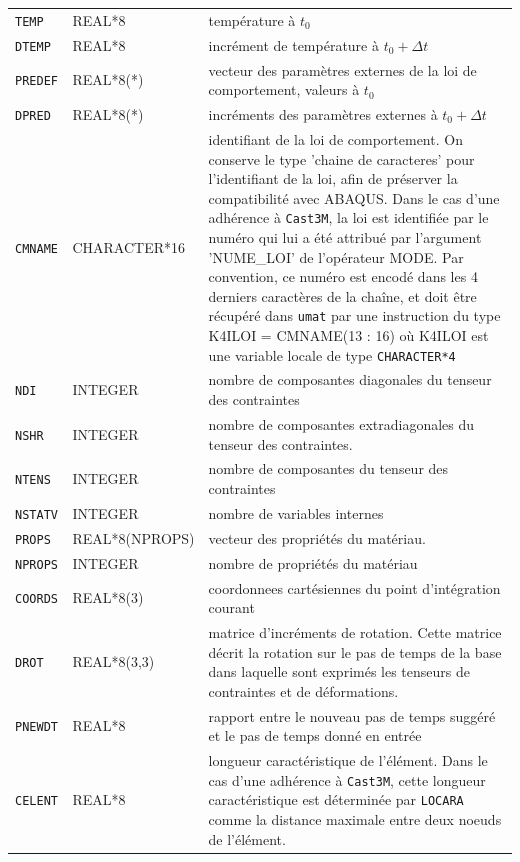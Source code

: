 \documentclass[rectoverso,pleiades,pstricks,leqno,anti]{texmf/note_technique_2010}
\newcommand{\castem}{\texttt{Cast3M}}
\begin{document}
\begin{longtable}[htpb]{|p{}|p{}|p{9cm}|}
  {\tt TEMP } & REAL*8 & température à $t_{0}$ \\
  {\tt DTEMP } & REAL*8 & incrément de température à $t_{0}+\Delta t$ \\
  {\tt PREDEF } & REAL*8(*) & vecteur des paramètres externes de la loi
  de comportement, valeurs à $t_{0}$ \\
  {\tt DPRED } & REAL*8(*) & incréments des paramètres externes à
  $t_{0}+\Delta t$ \\
  {\tt CMNAME } & CHARACTER*16 & identifiant de la loi de comportement.
  On conserve le type 'chaine de caracteres' pour l'identifiant de la
  loi, afin de préserver la compatibilité avec ABAQUS. Dans le cas d'une
  adhérence à \castem{}, la loi est identifiée par le numéro qui lui a
  été attribué par l'argument 'NUME\_LOI' de l'opérateur MODE. Par
  convention, ce numéro est encodé dans les 4 derniers caractères de la
  chaîne, et doit être récupéré dans {\tt umat} par une instruction du
  type K4ILOI = CMNAME(13 : 16) où K4ILOI est une variable locale de
  type {\tt CHARACTER*4} \\
  {\tt NDI } & INTEGER & nombre de composantes diagonales du tenseur des
  contraintes \\
  {\tt NSHR } & INTEGER & nombre de composantes extradiagonales du
  tenseur des contraintes. \\
  {\tt NTENS } & INTEGER & nombre de composantes du tenseur des
  contraintes\\ {\tt NSTATV } & INTEGER & nombre de variables internes
  \\
  {\tt PROPS } & REAL*8(NPROPS) & vecteur des propriétés du matériau. \\
  {\tt NPROPS } & INTEGER & nombre de propriétés du matériau \\
  {\tt COORDS } & REAL*8(3) & coordonnees cartésiennes du point
  d'intégration courant \\
  {\tt DROT } & REAL*8(3,3) & matrice d'incréments de rotation. Cette
  matrice décrit la rotation sur le pas de temps de la base dans
  laquelle sont exprimés les tenseurs de contraintes et de déformations.
  \\
  {\tt PNEWDT } & REAL*8 & rapport entre le nouveau pas de temps suggéré
  et le pas de temps donné en entrée \\
  {\tt CELENT } & REAL*8 & longueur caractéristique de l'élément. Dans
  le cas d'une adhérence à \castem{}, cette longueur caractéristique est
  déterminée par {\tt LOCARA} comme la distance maximale entre deux
  noeuds de l'élément. \\

\end{longtable}
\end{document}

